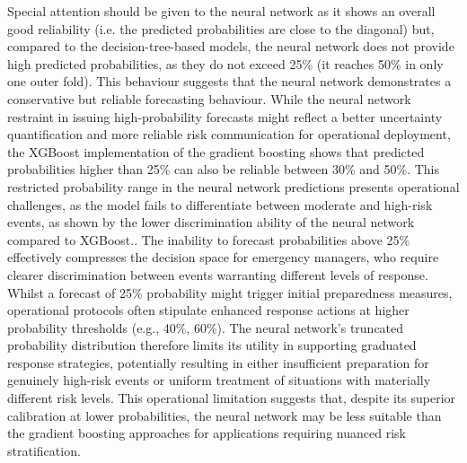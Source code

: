 Special attention should be given to the neural network as it shows an overall good reliability (i.e. the predicted probabilities are close to the diagonal) but,  compared to the decision-tree-based models, the neural network does not provide high predicted probabilities, as they do not exceed 25\% (it reaches 50\% in only one outer fold). This behaviour suggests that the neural network demonstrates a conservative but reliable forecasting behaviour. While the neural network restraint in issuing high-probability forecasts might reflect a better uncertainty quantification and more reliable risk communication for operational deployment, the XGBoost implementation of the gradient boosting shows that predicted probabilities higher than 25\% can also be reliable between 30\% and 50\%. This restricted probability range in the neural network predictions presents operational challenges, as the model fails to differentiate between moderate and high-risk events, as shown by the lower discrimination ability of the neural network compared to XGBoost.. The inability to forecast probabilities above 25\% effectively compresses the decision space for emergency managers, who require clearer discrimination between events warranting different levels of response. Whilst a forecast of 25\% probability might trigger initial preparedness measures, operational protocols often stipulate enhanced response actions at higher probability thresholds (e.g., 40\%, 60\%). The neural network's truncated probability distribution therefore limits its utility in supporting graduated response strategies, potentially resulting in either insufficient preparation for genuinely high-risk events or uniform treatment of situations with materially different risk levels. This operational limitation suggests that, despite its superior calibration at lower probabilities, the neural network may be less suitable than the gradient boosting approaches for applications requiring nuanced risk stratification.

